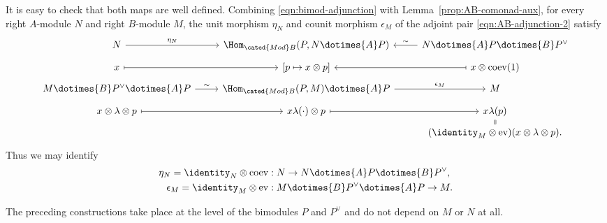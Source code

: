 It is easy to check that both maps are well defined. Combining
\eqref{eqn:bimod-adjunction} with Lemma~\ref{prop:AB-comonad-aux}, for every
right $A$-module $N$ and right $B$-module $M$, the unit morphism $\eta_N$ and
counit morphism $\epsilon_M$ of the adjoint pair
\eqref{eqn:AB-adjunction-2} satisfy
\[\begin{tikzcd}[row sep=tiny]
	N \arrow[r, "\eta_N"] & \Hom_{\cated{Mod}B}(P, N \dotimes{A} P) & N \dotimes{A} P \dotimes{B} P^\vee \arrow[l, "\sim"'] \\
	x \arrow[mapsto, r] & {[p \mapsto x \otimes p]} & x \otimes \mathrm{coev}(1) \arrow[mapsto, l] \\
	M \dotimes{B} P^\vee \dotimes{A} P \arrow[r, "\sim"] & \Hom_{\cated{Mod}B}(P, M) \dotimes{A} P \arrow[r, "\epsilon_M"] & M \\
	x \otimes \lambda \otimes p \arrow[mapsto, r] & x \lambda(\cdot) \otimes p \arrow[mapsto, r] & x\lambda(p) \arrow[equal, d] \\
	& & (\identity_M \otimes \mathrm{ev})(x \otimes \lambda \otimes p).
\end{tikzcd}\]
Thus we may identify
\begin{align*}
	\eta_N = \identity_N \otimes \mathrm{coev}: \; & N \to N \dotimes{A} P \dotimes{B} P^\vee , \\
	\epsilon_M = \identity_M \otimes \mathrm{ev}: \; & M \dotimes{B} P^\vee \dotimes{A} P \to M.
\end{align*}

The preceding constructions take place at the level of the bimodules $P$ and
$P^\vee$ and do not depend on $M$ or $N$ at all.

